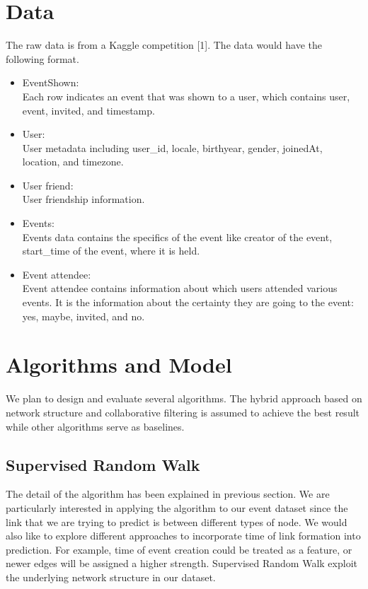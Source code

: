 \documentclass{article}
\begin{document}
\section{Data}
The raw data is from a Kaggle competition [1]. The data would have the following format. 
\begin{itemize}
\item EventShown:\\
Each row indicates an event that was shown to a user, which contains user, event, invited, and timestamp.

\item User:\\
User metadata including user\_id, locale, birthyear, gender, joinedAt, location, and timezone.

\item User friend:\\
User friendship information.

\item Events:\\
Events data contains the specifics of the event like creator of the event, start\_time of the event, where it is held.

\item Event attendee:\\
Event attendee contains information about which users attended various events. It is the information about the certainty they are going to the event: yes, maybe, invited, and no.
\end{itemize}


\section{Algorithms and Model}
We plan to design and evaluate several algorithms. The hybrid approach based on network structure and collaborative filtering is assumed to achieve the best result while other algorithms serve as baselines.

\subsection{Supervised Random Walk}
The detail of the algorithm has been explained in previous section. We are particularly interested in applying the algorithm to our event dataset since the link that we are trying to predict is between different types of node. We would also like to explore different approaches to incorporate time of link formation into prediction. For example, time of event creation could be treated as a feature, or newer edges will be assigned a higher strength. Supervised Random Walk exploit the underlying network structure in our dataset.
\end{document}
